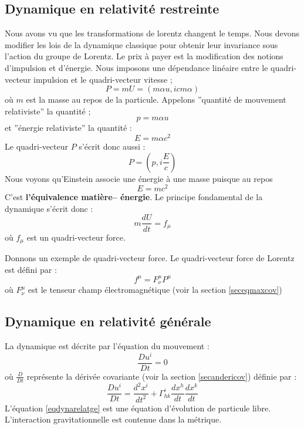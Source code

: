 \documentclass[12pt]{book}
\begin{document}
\subsection{Dynamique en relativit\'e restreinte}
Nous avons vu que les transformations de lorentz changent le temps.
Nous devons modifier les lois de la dynamique classique pour obtenir leur
invariance sous l'action du groupe de Lorentz. Le prix \`a payer est la
modification des notions d'impulsion et d'\'energie.
Nous imposons une d\'ependance lin\'eaire entre le quadri-vecteur
impulsion et le quadri-vecteur vitesse ;
\begin{equation}
P=mU=(m\alpha u,icm\alpha)
\end{equation}
o\`u $m$ est la masse au repos de la particule.
Appelons ''quantit\'e de mouvement relativiste'' la quantit\'e ;
\begin{equation}
p=m \alpha u
\end{equation}
et ''\'energie relativiste'' la quantit\'e :
\begin{equation}
E=m\alpha c^2
\end{equation}
Le quadri-vecteur $P$ s'\'ecrit donc aussi :
\begin{equation}
P=(p,i\frac{E}{c})
\end{equation}
Nous voyons qu'Einstein associe une \'energie \`a une masse puisque au
repos 
\begin{equation}
E=mc^2
\end{equation}
C'est {\bf l'\'equivalence mati\`ere-- \'energie}.
Le principe fondamental de la dynamique s'\'ecrit donc :
\begin{equation}
m\frac{dU}{dt}=f_\mu
\end{equation}
o\`u $f_\mu$ est un quadri-vecteur force.
\begin{exmp}
Donnons un exemple de quadri-vecteur force. Le quadri-vecteur force de
Lorentz est d\'efini par :
\begin{equation}
f^\mu=F^\mu_\nu P^\mu
\end{equation}
o\`u $F^\mu_\nu$ est le tenseur champ \'electromagn\'etique (voir la section
\ref{seceqmaxcov}) 
\end{exmp}

\subsection{Dynamique en relativit\'e g\'en\'erale}
La dynamique est d\'ecrite par l'\'equation du mouvement :
\begin{equation}\label{eqdynarelatge}
\frac{D u^i}{Dt}=0
\end{equation}
o\`u $\frac{D}{Dt}$ repr\'esente la d\'eriv\'ee covariante (voir
la section \ref{secandericov}) d\'efinie par :
\begin{equation}
\frac{D u^i}{Dt}=\frac{d^2x^i}{dt^2}+\Gamma^{i}_{hk} \frac{dx^h}{dt} \frac{dx^k}{dt}
\end{equation}
L'\'equation \ref{eqdynarelatge} est une \'equation d'\'evolution de
particule libre. L'interaction gravitationnelle est contenue dans la
m\'etrique.
\end{document}
